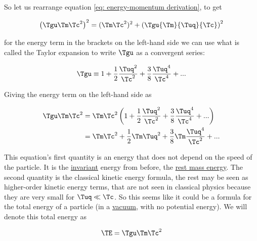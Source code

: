 \begin{derivation}

	So let us rearrange equation \eqref{eq: energy-momentum derivation}, to get

	\begin{equation}
		\label{eq: total relativistic energy}
		\left( \Tgu  \Tm  \Tc ^2 \right)^2 = (\Tm  \Tc ^2)^2 + \left( \Tgu  {\Tm }{\Tuq }{\Tc }\right)^2
	\end{equation}

	for the energy term in the brackets on the left-hand side we can use what is called the Taylor expansion to write $\Tgu $ as a convergent series:

	\begin{equation}
		\Tgu  \equiv 1 + \frac{1}{2}\frac{\Tuq ^2}{ \Tc ^2} + \frac{3}{8}\frac{\Tuq ^4}{\Tc ^4} + ...
	\end{equation}

	Giving the energy term on the left-hand side as

	\begin{equation}
		\begin{aligned}
			\Tgu  \Tm  \Tc ^2 & = \Tm  \Tc ^2  \left(1 + \frac{1}{2}\frac{\Tuq ^2}{ \Tc ^2} + \frac{3}{8}\frac{\Tuq ^4}{\Tc ^4} + ...
			\right)                                                                                                         \\
			                    & = \Tm  \Tc ^2 + \frac{1}{2} \Tm  \Tuq ^2 + \frac{3}{8} \Tm  \frac{\Tuq ^4}{ \Tc ^2} + ...
		\end{aligned}
	\end{equation}

	This equation's first quantity is an energy that does not depend on the speed of the particle.
	It is the \hyperlink{def-lorentz-invariant}{invariant} energy from before, the \hyperlink{def-rest-mass-energy}{rest mass energy}.
	The second quantity is the classical kinetic energy formula, the rest may be seen as higher-order kinetic energy terms, that are not seen in classical physics because they are very small for ${\Tuq } \ll {\Tc }$.
	So this seems like it could be a formula for the total energy of a particle (in a \hyperlink{def-vacuum}{vacuum}, with no potential energy).
	We will denote this total energy as

	\begin{equation}
		\label{eq: Total Energy Compact Version}
		{\TE } = \Tgu  \Tm  \Tc ^2
	\end{equation}


\end{derivation}
